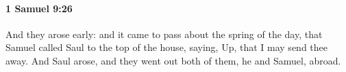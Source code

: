 
		\paragraph{1 Samuel 9:26} %
			\label{1SAMUEL-9-26}

			And they arose early: and it came to pass about the spring of the day, that Samuel called Saul to the top of the house, saying, Up, that I may send thee away. And Saul arose, and they went out both of them, he and Samuel, abroad.


